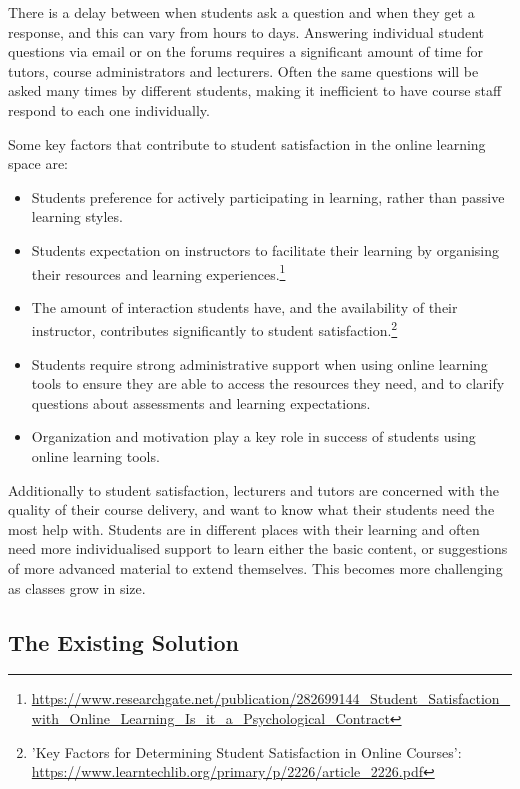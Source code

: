 \documentclass{article}
\begin{document}
There is a delay between when students ask a question and when they get a response, and this can vary from hours to days. Answering individual student questions via email or on the forums requires a significant amount of time for tutors, course administrators and lecturers. Often the same questions will be asked many times by different students, making it inefficient to have course staff respond to each one individually.

Some key factors that contribute to student satisfaction in the online learning space are:
\begin{itemize}
  \item Students preference for actively participating in learning, rather than passive learning styles.
  \item Students expectation on instructors to facilitate their learning by organising their resources and learning experiences.\footnote{\url{https://www.researchgate.net/publication/282699144_Student_Satisfaction_with_Online_Learning_Is_it_a_Psychological_Contract}}
  \item The amount of interaction students have, and the availability of their instructor, contributes significantly to student satisfaction.\footnote{'Key Factors for Determining Student Satisfaction in Online Courses': \url{https://www.learntechlib.org/primary/p/2226/article_2226.pdf}}
  \item Students require strong administrative support when using online learning tools to ensure they are able to access the resources 
  they need, and to clarify questions about assessments and learning expectations.
  \item Organization and motivation play a key role in success of students using online learning tools.
\end{itemize}

Additionally to student satisfaction, lecturers and tutors are concerned with the quality of their course delivery, and want to know what their students need the most help with. Students are in different places with their learning and often need more individualised support to learn either the basic content, or suggestions of more advanced material to extend themselves. This becomes more challenging as classes grow in size.


\subsection{The Existing Solution}
\end{document}
